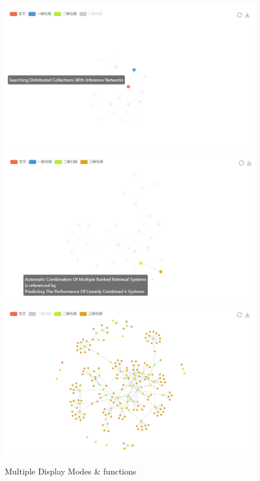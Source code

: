 \documentclass{book}
\begin{document}
\begin{figure}[H]
\centering
\includegraphics[scale=0.3]{img/zlt_rel_demo1.png}
\includegraphics[scale=0.3]{img/zlt_rel_demo2.png}
\includegraphics[scale=0.3]{img/zlt_rel_demo3.png}
\caption{Multiple Display Modes \& functions}
\end{figure}
\end{document}
